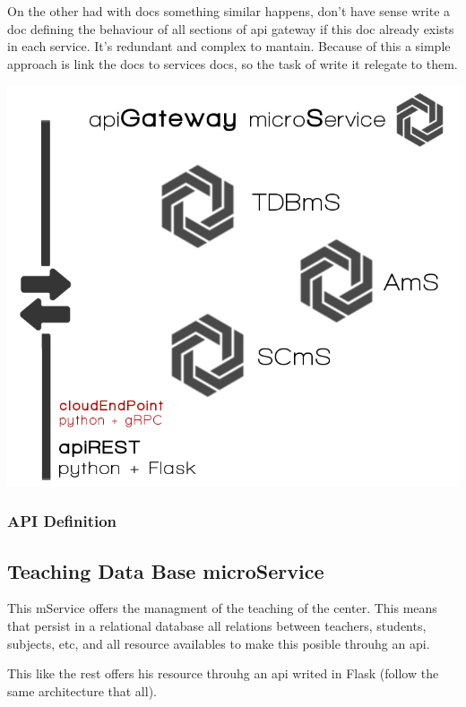 On the other had with docs something similar happens, don't have sense
write a doc defining the behaviour of all sections of api gateway
if this doc already exists in each service. It's redundant and complex
to mantain. Because of this a simple approach is link the docs to
services docs, so the task of write it relegate to them.


\begin{center}
\includegraphics[scale=0.35]{img/graphics/apigateway.png}
\end{center}

\subsubsection {API Definition}






\subsection{Teaching Data Base microService}


This mService offers the managment of the teaching of the center.
This means that persist in a relational database all relations between
teachers, students, subjects, etc, and all resource availables to
make this posible throuhg an api.\bigskip

This like the rest offers his resource throuhg an api writed in Flask
(follow the same architecture that all).

